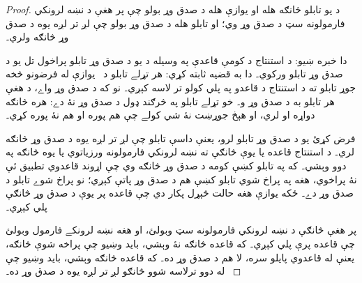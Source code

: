 \documentclass[12pt,a4paper,oneside]{report}
\theoremstyle{definition}
\begin{document}
\label{olpseg:OLP-0109-B010:start}
\begin{proof}
د يو تابلو څانګه هله او يوازې هله د صدق وړ بولو چې پر هغې
د نښه لرونکي فارمولونه سټ د صدق وړ وي؛ او تابلو هله د صدق وړ
بولو چې لږ تر لږه يوه د صدق وړ څانګه ولري۔
\label{olpseg:OLP-0109-B010:end}

\label{olpseg:OLP-0109-B011:start}
دا خبره ښيو: د استنتاج د کومې قاعدې په وسيله د يو د صدق وړ
تابلو پراخول تل يو د صدق وړ تابلو ورکوي۔ دا به قضيه
ثابته کړي: هر تړلے تابلو د~\LR{$\Gamma$} يوازې له فرضونو څخه جوړ
تابلو ته د استنتاج د قاعدو په پلي کولو تر لاسه کېږي۔ نو که
\LR{$\Gamma$} د صدق وړ واے، د هغې هر تابلو به د صدق وړ و۔ خو تړلے
تابلو په څرګند ډول د صدق وړ نۀ دے: هره څانګه دواړه
 او  لري، او هېڅ جوړښت
نۀ شي کولے چې  هم پوره او هم نۀ پوره کړي۔
\label{olpseg:OLP-0109-B011:end}

\label{olpseg:OLP-0109-B012:start}
فرض کړئ يو د صدق وړ تابلو لرو، يعنې داسې تابلو چې لږ
تر لږه يوه د صدق وړ څانګه لري۔ د استنتاج قاعده يا يوې څانګې ته
نښه لرونکي فارمولونه ورزياتوي يا يوه څانګه په دوو وېشي۔ که په
تابلو کښې کومه د صدق وړ څانګه وي چې اړوند قاعدوي تطبيق ئې نۀ
پراخوي، هغه په پراخ شوي تابلو کښې هم د صدق وړ پاتې کېږي؛ نو
پراخ شوے تابلو د صدق وړ دے۔ ځکه يوازې هغه حالت څېړل پکار دي چې
قاعده پر يوې د صدق وړ څانګې پلي کېږي۔
\label{olpseg:OLP-0109-B012:end}

\label{olpseg:OLP-0109-B013:start}
\LR{$\Gamma$} پر هغې څانګې د نښه لرونکي فارمولونه سټ وبولئ، او
 هغه نښه لرونکے فارمول وبولئ چې قاعده
پرې پلي کېږي۔ که قاعده څانګه نۀ وېشي، بايد وښيو چې پراخه شوې څانګه،
يعنې \LR{$\Gamma$} له قاعدوي پايلو سره، لا هم د صدق وړ ده۔ که قاعده
څانګه وېشي، بايد وښيو چې له دوو ترلاسه شوو څانګو لږ تر لږه يوه د
صدق وړ ده۔
\label{olpseg:OLP-0109-B013:end}


\end{proof}
\end{document}
